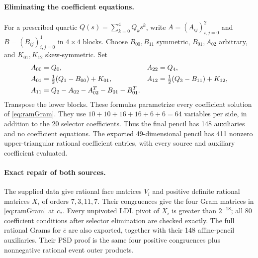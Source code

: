 \documentclass[10pt]{article}
\begin{document}
\paragraph{Eliminating the coefficient equations.}
For a prescribed quartic $Q(s)=\sum_{k=0}^4Q_ks^k$, write
$A=(A_{ij})_{i,j=0}^2$ and $B=(B_{ij})_{i,j=0}^1$ in $4\times4$ blocks.
Choose $B_{00},B_{11}$ symmetric, $B_{01},A_{02}$ arbitrary, and
$K_{01},K_{12}$ skew-symmetric. Set
\begin{align}
A_{00}&=Q_0,& A_{22}&=Q_4,\notag\\
A_{01}&=\tfrac12(Q_1-B_{00})+K_{01},&
A_{12}&=\tfrac12(Q_3-B_{11})+K_{12},\notag\\
A_{11}&=Q_2-A_{02}-A_{02}^T-B_{01}-B_{01}^T.               \label{eq:param}
\end{align}
Transpose the lower blocks. These formulas parametrize every coefficient
solution of \eqref{eq:ramGram}. They use $10+10+16+16+6+6=64$ variables
per side, in addition to the 20 selector coefficients. Thus the final
pencil has 148 auxiliaries and no coefficient equations. The exported
49-dimensional pencil has 411 nonzero upper-triangular rational coefficient
entries, with every source and auxiliary coefficient evaluated.

\paragraph{Exact repair of both sources.}
The supplied data give rational face matrices $V_i$ and positive definite
rational matrices $X_i$ of orders $7,3,11,7$. Their congruences give the
four Gram matrices in \eqref{eq:ramGram} at $c_*$. Every unpivoted LDL
pivot of $X_i$ is greater than $2^{-18}$; all 80 coefficient conditions
after selector elimination are checked exactly. The full rational Grams for
$\bar c$ are also exported, together with their 148 affine-pencil
auxiliaries. Their PSD proof is the same four positive congruences plus
nonnegative rational event outer products.
\end{document}
